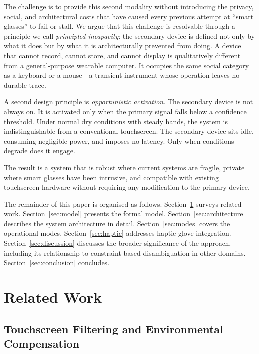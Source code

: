 \documentclass[11pt,letterpaper]{article}
\begin{document}
The challenge is to provide this second modality without introducing the privacy,
social, and architectural costs that have caused every previous attempt at
``smart glasses'' to fail or stall. We argue that this challenge is resolvable
through a principle we call \emph{principled incapacity}: the secondary device
is defined not only by what it does but by what it is architecturally prevented
from doing. A device that cannot record, cannot store, and cannot display is
qualitatively different from a general-purpose wearable computer. It occupies
the same social category as a keyboard or a mouse---a transient instrument
whose operation leaves no durable trace.

A second design principle is \emph{opportunistic activation}. The secondary device
is not always on. It is activated only when the primary signal falls below a
confidence threshold. Under normal dry conditions with steady hands, the system
is indistinguishable from a conventional touchscreen. The secondary device sits
idle, consuming negligible power, and imposes no latency. Only when conditions
degrade does it engage.

The result is a system that is robust where current systems are fragile, private
where smart glasses have been intrusive, and compatible with existing touchscreen
hardware without requiring any modification to the primary device.

The remainder of this paper is organised as follows. Section~\ref{sec:related}
surveys related work. Section~\ref{sec:model} presents the formal model.
Section~\ref{sec:architecture} describes the system architecture in detail.
Section~\ref{sec:modes} covers the operational modes. Section~\ref{sec:haptic}
addresses haptic glove integration. Section~\ref{sec:discussion} discusses the
broader significance of the approach, including its relationship to constraint-based
disambiguation in other domains. Section~\ref{sec:conclusion} concludes.

\section{Related Work}
\label{sec:related}

\subsection{Touchscreen Filtering and Environmental Compensation}
\end{document}
